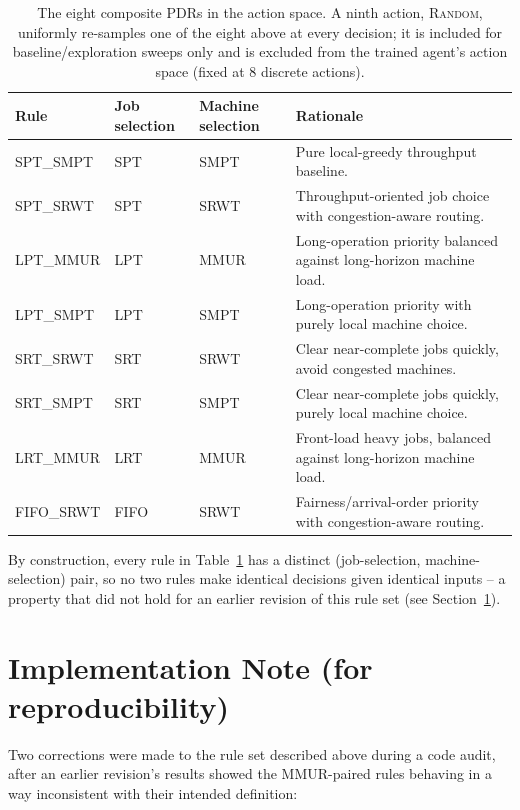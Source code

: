 \documentclass[conference]{IEEEtran}
\begin{document}
\begin{table}[t]
\centering
\small
\caption{The eight composite PDRs in the action space. A ninth action, \textsc{Random},
uniformly re-samples one of the eight above at every decision; it is included for
baseline/exploration sweeps only and is excluded from the trained agent's action
space (fixed at 8 discrete actions).}
\label{tab:rules}
\begin{tabular}{@{}lllp{11cm}@{}}
\toprule
\textbf{Rule} & \textbf{Job selection} & \textbf{Machine selection} & \textbf{Rationale} \\
\midrule
SPT\_SMPT & SPT & SMPT & Pure local-greedy throughput baseline. \\
SPT\_SRWT & SPT & SRWT & Throughput-oriented job choice with congestion-aware routing. \\
LPT\_MMUR & LPT & MMUR & Long-operation priority balanced against long-horizon machine load. \\
LPT\_SMPT & LPT & SMPT & Long-operation priority with purely local machine choice. \\
SRT\_SRWT & SRT & SRWT & Clear near-complete jobs quickly, avoid congested machines. \\
SRT\_SMPT & SRT & SMPT & Clear near-complete jobs quickly, purely local machine choice. \\
LRT\_MMUR & LRT & MMUR & Front-load heavy jobs, balanced against long-horizon machine load. \\
FIFO\_SRWT & FIFO & SRWT & Fairness/arrival-order priority with congestion-aware routing. \\
\bottomrule
\end{tabular}
\end{table}

By construction, every rule in Table~\ref{tab:rules} has a distinct
(job-selection, machine-selection) pair, so no two rules make identical decisions
given identical inputs -- a property that did not hold for an earlier revision of
this rule set (see Section~\ref{sec:implementation}).

\section{Implementation Note (for reproducibility)}
\label{sec:implementation}

Two corrections were made to the rule set described above during a code audit, after
an earlier revision's results showed the MMUR-paired rules behaving in a way
inconsistent with their intended definition:
\end{document}
